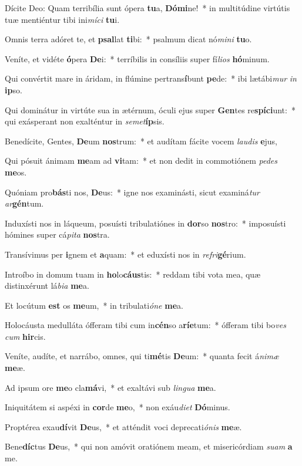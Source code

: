 \item Dícite Deo: Quam terribília sunt ópera \textbf{tu}a, \textbf{Dó}\textbf{mi}ne!~* in multitúdine virtútis tuæ mentiéntur tibi ini\textit{mí}\textit{ci} \textbf{tu}i.
\item Omnis terra adóret te, et \textbf{psal}lat \textbf{ti}bi:~* psalmum dicat nó\textit{mi}\textit{ni} \textbf{tu}o.
\item Veníte, et vidéte \textbf{ó}pera \textbf{De}i:~* terríbilis in consíliis super fí\textit{li}\textit{os} \textbf{hó}minum.
\item Qui convértit mare in áridam, in flúmine pertrans\textbf{í}bunt \textbf{pe}de:~* ibi lætábi\textit{mur} \textit{in} \textbf{ip}so.
\item Qui dominátur in virtúte sua in ætérnum, óculi ejus super \textbf{Gen}tes re\textbf{spí}\textbf{ci}unt:~* qui exásperant non exalténtur in \textit{se}\textit{met}\textbf{íp}sis.
\item Benedícite, Gentes, \textbf{De}um \textbf{nos}trum:~* et audítam fácite vocem \textit{lau}\textit{dis} \textbf{e}jus,
\item Qui pósuit ánimam \textbf{me}am ad \textbf{vi}tam:~* et non dedit in commotiónem \textit{pe}\textit{des} \textbf{me}os.
\item Quóniam pro\textbf{bás}ti nos, \textbf{De}us:~* igne nos examinásti, sicut examiná\textit{tur} \textit{ar}\textbf{gén}tum.
\item Induxísti nos in láqueum, posuísti tribulatiónes in \textbf{dor}so \textbf{nos}tro:~* imposuísti hómines super cá\textit{pi}\textit{ta} \textbf{nos}tra.
\item Transívimus per \textbf{i}gnem et \textbf{a}quam:~* et eduxísti nos in \textit{re}\textit{fri}\textbf{gé}rium.
\item Introíbo in domum tuam in \textbf{ho}lo\textbf{cáus}tis:~* reddam tibi vota mea, quæ distinxérunt lá\textit{bi}\textit{a} \textbf{me}a.
\item Et locútum \textbf{est} os \textbf{me}um,~* in tribulati\textit{ó}\textit{ne} \textbf{me}a.
\item Holocáusta medulláta ófferam tibi cum in\textbf{cén}so a\textbf{rí}\textbf{e}tum:~* ófferam tibi bo\textit{ves} \textit{cum} \textbf{hir}cis.
\item Veníte, audíte, et narrábo, omnes, qui ti\textbf{mé}tis \textbf{De}um:~* quanta fecit á\textit{ni}\textit{mæ} \textbf{me}æ.
\item Ad ipsum ore \textbf{me}o cla\textbf{má}vi,~* et exaltávi sub \textit{lin}\textit{gua} \textbf{me}a.
\item Iniquitátem si aspéxi in \textbf{cor}de \textbf{me}o,~* non exáu\textit{di}\textit{et} \textbf{Dó}minus.
\item Proptérea exau\textbf{dí}vit \textbf{De}us,~* et atténdit voci deprecati\textit{ó}\textit{nis} \textbf{me}æ.
\item Bene\textbf{díc}tus \textbf{De}us,~* qui non amóvit oratiónem meam, et misericórdiam \textit{su}\textit{am} \textbf{a} me.
